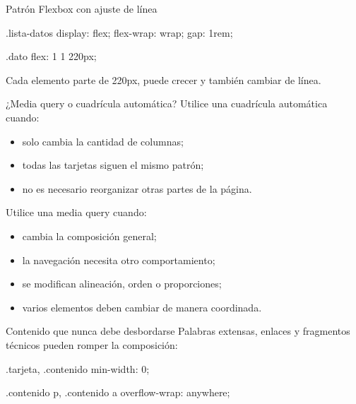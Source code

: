 \documentclass[aspectratio=169,11pt]{beamer}
\begin{document}
    \begin{frame}[fragile]{Patrón Flexbox con ajuste de línea}
        \begin{csscodedark}
            .lista-datos {
                display: flex;
                flex-wrap: wrap;
                gap: 1rem;
            }

            .dato {
                flex: 1 1 220px;
            }
        \end{csscodedark}

        Cada elemento parte de 220px, puede crecer y también cambiar de línea.

    \end{frame}

    \begin{frame}{¿Media query o cuadrícula automática?}
        Utilice una cuadrícula automática cuando:

        \begin{itemize}
            \item solo cambia la cantidad de columnas;
            \item todas las tarjetas siguen el mismo patrón;
            \item no es necesario reorganizar otras partes de la página.
        \end{itemize}

        Utilice una media query cuando:

        \begin{itemize}
            \item cambia la composición general;
            \item la navegación necesita otro comportamiento;
            \item se modifican alineación, orden o proporciones;
            \item varios elementos deben cambiar de manera coordinada.
        \end{itemize}
    \end{frame}

    \begin{frame}[fragile]{Contenido que nunca debe desbordarse}
        Palabras extensas, enlaces y fragmentos técnicos pueden romper la composición:

        \begin{csscodedark}
            .tarjeta,
            .contenido {
                min-width: 0;
            }

            .contenido p,
            .contenido a {
                overflow-wrap: anywhere;
            }
        \end{csscodedark}

    \end{frame}
\end{document}

